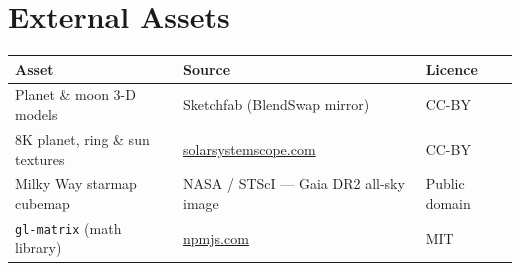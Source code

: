 \documentclass[11pt,a4paper]{article}
\begin{document}
\section{External Assets}

\smallskip
\begin{tabular}{@{}p{4.4cm}p{6.2cm}p{4.4cm}@{}}
\toprule
Asset & Source & Licence \\
\midrule
Planet \& moon 3-D models
  & Sketchfab (BlendSwap mirror)
  & CC-BY \\
8K planet, ring \& sun textures
  & \href{https://www.solarsystemscope.com/textures/}{solarsystemscope.com}
  & CC-BY \\
Milky Way starmap cubemap
  & NASA / STScI --- Gaia DR2 all-sky image
  & Public domain \\
\texttt{gl-matrix} (math library)
  & \href{https://npmjs.com/package/gl-matrix}{npmjs.com}
  & MIT \\
\bottomrule
\end{tabular}
\end{document}
